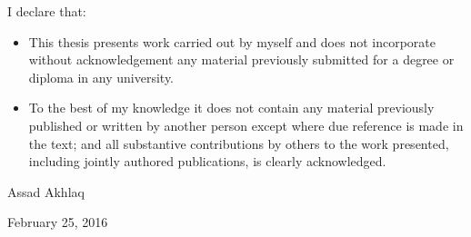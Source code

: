 I declare that:
\begin{itemize}

\item{This thesis presents work carried out by myself and does not incorporate without acknowledgement any material previously submitted for a degree or diploma in any university.}

\item{To the best of my knowledge it does not contain any material previously published or written by another person except where due reference is made in the text; and all substantive contributions by others to the work presented, including jointly authored publications, is clearly acknowledged.}

\end{itemize}

\vspace{2cm}

Assad Akhlaq \par
\setlength\parindent{22pt}February 25, 2016